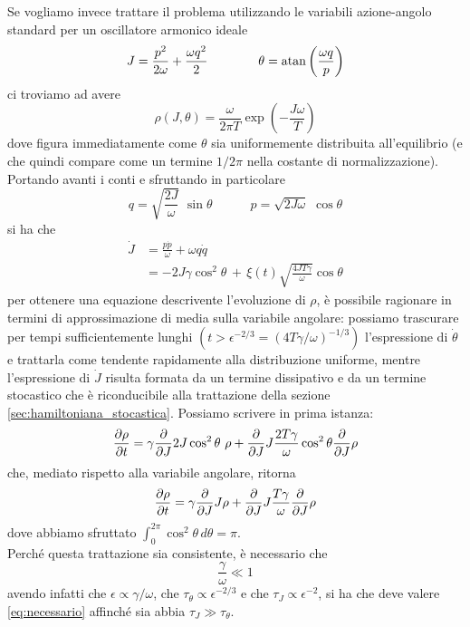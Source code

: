 \documentclass[10pt,a4paper]{article}
\begin{document}
Se vogliamo invece trattare il problema utilizzando le variabili azione-angolo standard per un oscillatore armonico ideale
\begin{equation}
	J = \frac{p^2}{2\omega} + \frac{\omega q^2}{2} \quad\quad\quad\quad \theta = \atan\left(\frac{\omega q}{p}\right)
\end{equation}
ci troviamo ad avere
\begin{equation}
	\rho(J, \theta) = \frac{\omega}{2\pi T} \exp\left(-\frac{J\omega}{T}\right)
\end{equation}
dove figura immediatamente come \(\theta\) sia uniformemente distribuita all'equilibrio (e che quindi compare come un termine \(1/2\pi\) nella costante di normalizzazione).\\
Portando avanti i conti e sfruttando in particolare
\begin{equation}
	q = \sqrt{\frac{2J}{\omega}}\,\,\sin{\theta} \quad\quad\quad p = \sqrt{2J\omega}\,\,\cos{\theta}
\end{equation}
si ha che
\begin{align}
	\dot{J} &= \frac{p\dot{p}}{\omega} + \omega q\dot{q}\\
	&= -2J\gamma \cos^2\theta \,+\, \xi(t)\sqrt{\frac{4JT\gamma}{\omega}}\cos\theta
\end{align}
per ottenere una equazione descrivente l'evoluzione di \(\rho\), è possibile ragionare in termini di approssimazione di media sulla variabile angolare: possiamo trascurare per tempi sufficientemente lunghi \((t > \epsilon^{-2/3} = (4T\gamma/\omega)^{-1/3})\) l'espressione di \(\dot{\theta}\) e trattarla come tendente rapidamente alla distribuzione uniforme, mentre l'espressione di \(\dot{J}\) risulta formata da un termine dissipativo e da un termine stocastico che è riconducibile alla trattazione della sezione \ref{sec:hamiltoniana_stocastica}. Possiamo scrivere in prima istanza:
\begin{equation}
	\pdv{\rho}{t} = \gamma \pdv{}{J} 2J\cos^2\theta\,\,\rho + \pdv{}{J} J\frac{2T\gamma}{\omega}\cos^2\theta \pdv{}{J} \rho
\end{equation} 
che, mediato rispetto alla variabile angolare, ritorna
\begin{equation}
	\pdv{\rho}{t} = \gamma \pdv{}{J} J\rho + \pdv{}{J} J\frac{T\gamma}{\omega} \pdv{}{J} \rho
	\label{eq:pendolo_fokker_planck_1}
\end{equation}
dove abbiamo sfruttato \(\int_0^{2\pi}\cos^2\theta\, d\theta = \pi\).\\
Perché questa trattazione sia consistente, è necessario che
\begin{equation}
	\frac{\gamma}{\omega} \ll 1
	\label{eq:necessario}
\end{equation}
avendo infatti che \(\epsilon \propto \gamma/\omega\), che \(\tau_\theta \propto \epsilon^{-2/3}\) e che \(\tau_J \propto \epsilon^{-2}\), si ha che deve valere \eqref{eq:necessario} affinché sia abbia \(\tau_J \gg \tau_\theta\). 
\end{document}
